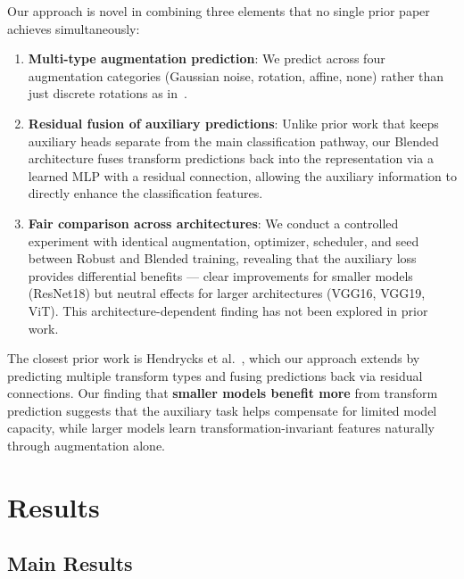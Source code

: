 \documentclass[11pt,a4paper]{article}
\begin{document}
Our approach is novel in combining three elements that no single prior paper achieves simultaneously:
\begin{enumerate}
    \item \textbf{Multi-type augmentation prediction}: We predict across four augmentation categories (Gaussian noise, rotation, affine, none) rather than just discrete rotations as in~\cite{hendrycks2019selfsupervised,gidaris2018rotnet,sun2020ttt}.
    \item \textbf{Residual fusion of auxiliary predictions}: Unlike prior work that keeps auxiliary heads separate from the main classification pathway, our Blended architecture fuses transform predictions back into the representation via a learned MLP with a residual connection, allowing the auxiliary information to directly enhance the classification features.
    \item \textbf{Fair comparison across architectures}: We conduct a controlled experiment with identical augmentation, optimizer, scheduler, and seed between Robust and Blended training, revealing that the auxiliary loss provides differential benefits --- clear improvements for smaller models (ResNet18) but neutral effects for larger architectures (VGG16, VGG19, ViT). This architecture-dependent finding has not been explored in prior work.
\end{enumerate}

The closest prior work is Hendrycks et al.~\cite{hendrycks2019selfsupervised}, which our approach extends by predicting multiple transform types and fusing predictions back via residual connections. Our finding that \textbf{smaller models benefit more} from transform prediction suggests that the auxiliary task helps compensate for limited model capacity, while larger models learn transformation-invariant features naturally through augmentation alone.

\section{Results}
\subsection{Main Results}
\end{document}
